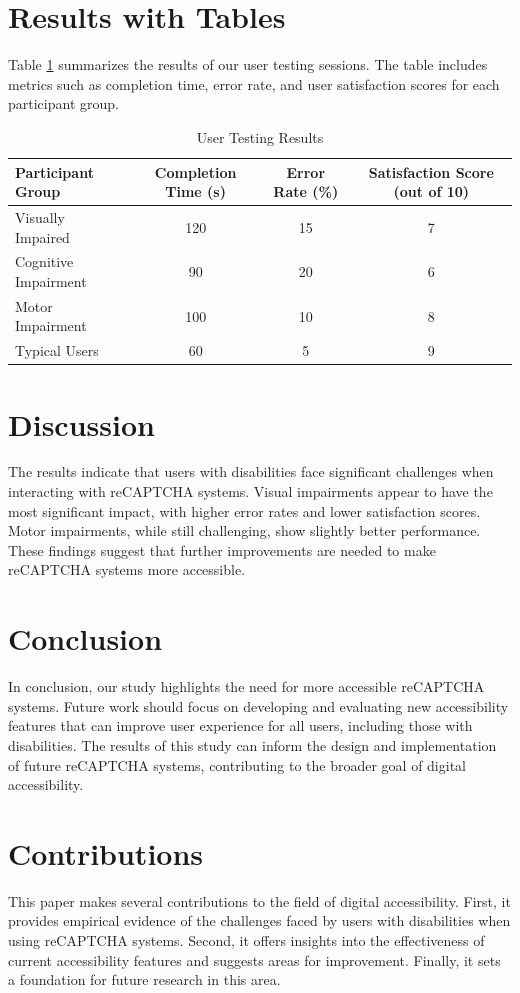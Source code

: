 \documentclass{article}
\begin{document}
\section{Results with Tables}
Table \ref{tab:results} summarizes the results of our user testing sessions. The table includes metrics such as completion time, error rate, and user satisfaction scores for each participant group.

\begin{table}[ht]
\centering
\caption{User Testing Results}
\label{tab:results}
\begin{tabular}{lccc}
\toprule
Participant Group & Completion Time (s) & Error Rate (\%) & Satisfaction Score (out of 10) \\
\midrule
Visually Impaired & 120 & 15 & 7 \\
Cognitive Impairment & 90 & 20 & 6 \\
Motor Impairment & 100 & 10 & 8 \\
Typical Users & 60 & 5 & 9 \\
\bottomrule
\end{tabular}
\end{table}

\section{Discussion}
The results indicate that users with disabilities face significant challenges when interacting with reCAPTCHA systems. Visual impairments appear to have the most significant impact, with higher error rates and lower satisfaction scores. Motor impairments, while still challenging, show slightly better performance. These findings suggest that further improvements are needed to make reCAPTCHA systems more accessible.

\section{Conclusion}
In conclusion, our study highlights the need for more accessible reCAPTCHA systems. Future work should focus on developing and evaluating new accessibility features that can improve user experience for all users, including those with disabilities. The results of this study can inform the design and implementation of future reCAPTCHA systems, contributing to the broader goal of digital accessibility.

\section{Contributions}
This paper makes several contributions to the field of digital accessibility. First, it provides empirical evidence of the challenges faced by users with disabilities when using reCAPTCHA systems. Second, it offers insights into the effectiveness of current accessibility features and suggests areas for improvement. Finally, it sets a foundation for future research in this area.
\end{document}

